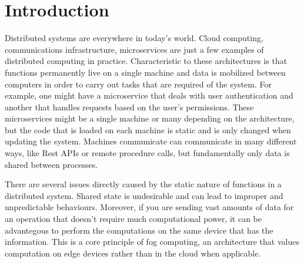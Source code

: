 
\chapter{Introduction}
\label{cha:introduction}



Distributed systems are everywhere in today's world. Cloud computing, communications infrastructure, microservices are just a few examples of distributed computing in practice. Characteristic to these architectures is that functions permanently live on a single machine and data is mobilized between computers in order to carry out tasks that are required of the system. For example, one might have a microservice that deals with user authentication and another that handles requests based on the user's permissions. These microservices might be a single machine or many depending on the architecture, but the code that is loaded on each machine is static and is only changed when updating the system. Machines communicate can communicate in many different ways, like Rest APIs or remote procedure calls, but fundamentally only data is shared between processes.


There are several issues directly caused by the static nature of functions in a distributed system. Shared state is undesirable and can lead to improper and unpredictable behaviours. Moreover, if you are sending vast amounts of data for an operation that doesn't require much computational power, it can be advantegous to perform the computations on the same device that has the information. This is a core principle of fog computing, an architecture that values computation on edge devices rather than in the cloud when applicable. 




\endinput

